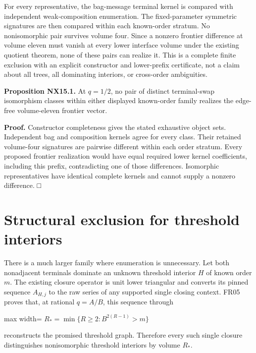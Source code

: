 \documentclass[
  11pt,
  a4paper,
]{report}
\begin{document}
For every representative, the bag-message terminal kernel is compared
with independent weak-composition enumeration. The fixed-parameter
symmetric signatures are then compared within each known-order stratum.
No nonisomorphic pair survives volume four. Since a nonzero frontier
difference at volume eleven must vanish at every lower interface volume
under the existing quotient theorem, none of these pairs can realize it.
This is a complete finite exclusion with an explicit constructor and
lower-prefix certificate, not a claim about all trees, all dominating
interiors, or cross-order ambiguities.

\textbf{Proposition NX15.1.} At \(q=1/2\), no pair of distinct
terminal-swap isomorphism classes within either displayed known-order
family realizes the edge-free volume-eleven frontier vector.

\textbf{Proof.} Constructor completeness gives the stated exhaustive
object sets. Independent bag and composition kernels agree for every
class. Their retained volume-four signatures are pairwise different
within each order stratum. Every proposed frontier realization would
have equal required lower kernel coefficients, including this prefix,
contradicting one of those differences. Isomorphic representatives have
identical complete kernels and cannot supply a nonzero difference. □

\hypertarget{structural-exclusion-for-threshold-interiors}{%
\section{Structural exclusion for threshold
interiors}\label{structural-exclusion-for-threshold-interiors}}

There is a much larger family where enumeration is unnecessary. Let both
nonadjacent terminals dominate an unknown threshold interior \(H\) of
known order \(m\). The existing closure operator is unit lower
triangular and converts its pinned sequence \(A_{H,j}\) to the raw
series of any supported single closing context. FR05 proves that, at
rational \(q=A/B\), this sequence through

\begin{center}
\begin{adjustbox}{max width=\linewidth}
$\displaystyle
 R_* =\min\{R\ge2:B^{2(R-1)}>m\}
$
\end{adjustbox}
\end{center}

reconstructs the promised threshold graph. Therefore every such single
closure distinguishes nonisomorphic threshold interiors by volume
\(R_*\).
\end{document}
